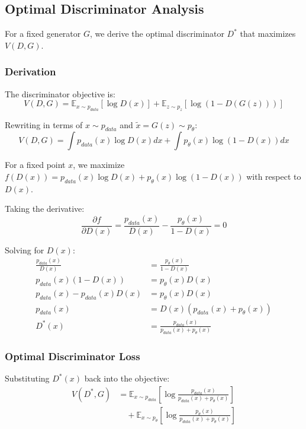 \documentclass[conference,12pt]{IEEEtran}
\begin{document}
\subsection{Optimal Discriminator Analysis}

For a fixed generator $G$, we derive the optimal discriminator $D^*$ that maximizes $V(D,G)$.

\subsubsection{Derivation}

The discriminator objective is:
\begin{equation}
    V(D, G) = \mathbb{E}_{x \sim p_{data}}[\log D(x)] + \mathbb{E}_{z \sim p_z}[\log(1-D(G(z)))]
\end{equation}

Rewriting in terms of $x \sim p_{data}$ and $\tilde{x} = G(z) \sim p_\theta$:
\begin{equation}
    V(D, G) = \int p_{data}(x) \log D(x) dx + \int p_\theta(x) \log(1-D(x)) dx
\end{equation}

For a fixed point $x$, we maximize $f(D(x)) = p_{data}(x) \log D(x) + p_\theta(x) \log(1-D(x))$ with respect to $D(x)$.

Taking the derivative:
\begin{equation}
    \frac{\partial f}{\partial D(x)} = \frac{p_{data}(x)}{D(x)} - \frac{p_\theta(x)}{1-D(x)} = 0
\end{equation}

Solving for $D(x)$:
\begin{align}
    \frac{p_{data}(x)}{D(x)} &= \frac{p_\theta(x)}{1-D(x)} \\
    p_{data}(x)(1-D(x)) &= p_\theta(x) D(x) \\
    p_{data}(x) - p_{data}(x) D(x) &= p_\theta(x) D(x) \\
    p_{data}(x) &= D(x)(p_{data}(x) + p_\theta(x)) \\
    D^*(x) &= \frac{p_{data}(x)}{p_{data}(x) + p_\theta(x)}
\end{align}

\subsubsection{Optimal Discriminator Loss}

Substituting $D^*(x)$ back into the objective:
\begin{align}
    V(D^*, G) &= \mathbb{E}_{x \sim p_{data}} \left[ \log \frac{p_{data}(x)}{p_{data}(x) + p_\theta(x)} \right] \\
    &\quad + \mathbb{E}_{x \sim p_\theta} \left[ \log \frac{p_\theta(x)}{p_{data}(x) + p_\theta(x)} \right]
\end{align}
\end{document}
